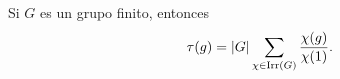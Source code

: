 

\begin{theorem}[Frobenius]
    Si $G$ es un grupo finito, entonces
    \[
    \tau(g)=|G|\sum_{\chi\in\operatorname{Irr}(G)}\frac{\chi(g)}{\chi(1)}.
    \]
\end{theorem}

